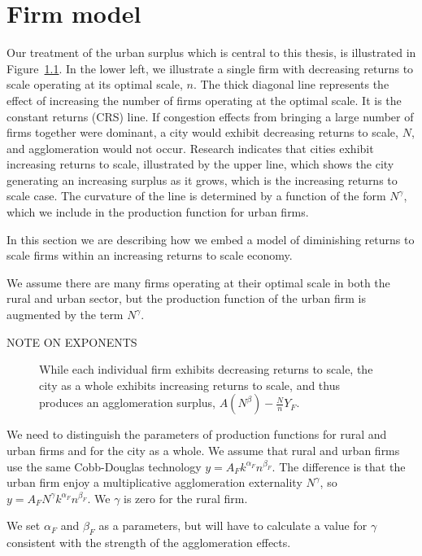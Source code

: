 
\chapter{Firm model}
Our treatment of the urban surplus which is central to this thesis, is illustrated in Figure~\ref{fig:Agglomeration-surplus}. In the lower left, we illustrate a single firm with decreasing returns to scale operating at its optimal scale, $n$. The thick diagonal line represents the effect of increasing the number of firms operating at the optimal scale. It is the constant returns (CRS) line. If congestion effects from bringing a large number of firms together were dominant, a city would exhibit decreasing returns to  scale,  $N$, and agglomeration would not occur. Research indicates that cities exhibit increasing returns to scale, illustrated by the upper line, which shows the city generating an increasing surplus as it grows, which is the increasing returns to scale case. The curvature of the line is determined by a function of the form $N^\gamma$, which we include in the production function for urban firms. 

In this section we are describing how we embed a model of diminishing returns to scale firms within an increasing returns to scale economy. 

We assume there are many firms operating at their optimal scale in both the rural and urban sector, but the production function of the urban firm is augmented by the term $N^\gamma$. 

NOTE ON EXPONENTS

\begin{figure}[htb]
    \centering

    \caption{While each individual firm exhibits decreasing returns to scale, the city as a whole exhibits increasing returns to scale, and thus produces an agglomeration surplus, $A(N^\beta)-\frac{N}{n}Y_F$.}
    \label{fig:Agglomeration-surplus}
\end{figure}

We need to distinguish the parameters of production functions for rural and urban firms and for the city as a whole. We assume that  rural and  urban firms use the same Cobb-Douglas technology ${y}=A_Fk^{\alpha_F}n^{\beta_F}$. The difference is that the urban firm enjoy a  multiplicative agglomeration externality $N^\gamma$, so ${y}=A_FN^\gamma  k^{\alpha_F}n^{\beta_F}$. We  $\gamma$ is zero for the rural firm.

We set $\alpha_F$ and $\beta_F$ as a parameters, but will have to calculate a value for $\gamma$ consistent with the strength of the agglomeration effects. 


